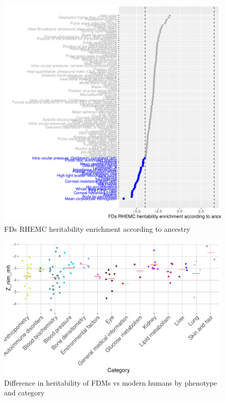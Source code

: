 \begin{figure}[htb]
    \centering
    \includegraphics[]{chapter4/figures/fds.rhemc.z_nim_mh.pdf}
    \caption{FDs RHEMC heritability enrichment according to ancestry}
    \label{fig:4.3}
\end{figure}
\begin{figure}[htb]
    \centering
    \includegraphics[width=\textwidth]{chapter4/figures/Z_nim_mh_category.pdf}
    \caption{Difference in heritability of FDMs vs modern humans by phenotype and category}
    \label{fig:4.4}
\end{figure}
\FloatBarrier
